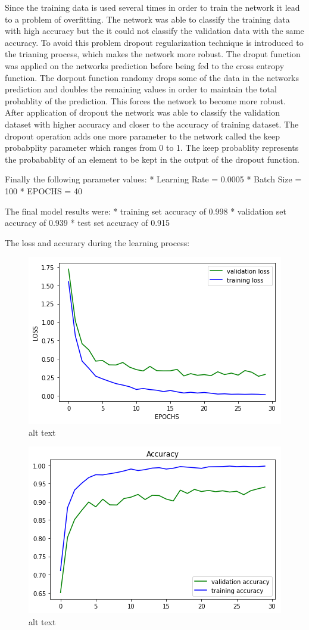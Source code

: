 \documentclass[11pt]{article}
\makeatletter
\def\maxwidth{\ifdim\Gin@nat@width>\linewidth\linewidth
    \else\Gin@nat@width\fi}
\let\Oldincludegraphics\includegraphics
\renewcommand{\includegraphics}[1]{\Oldincludegraphics[width=.8\maxwidth]{#1}}
\makeatother
\begin{document}
Since the training data is used several times in order to train the
network it lead to a problem of overfitting. The network was able to
classify the training data with high accuracy but the it could not
classify the validation data with the same accuracy. To avoid this
problem dropout regularization technique is introduced to the trianing
process, which makes the network more robust. The droput function was
applied on the networks prediction before being fed to the cross entropy
function. The dorpout function randomy drops some of the data in the
networks prediction and doubles the remaining values in order to
maintain the total probablity of the prediction. This forces the network
to become more robust. After application of dropout the network was able
to classify the validation dataset with higher accuracy and closer to
the accuracy of training dataset. The dropout operation adds one more
parameter to the network called the keep probabplity parameter which
ranges from 0 to 1. The keep probablity represents the probabablity of
an element to be kept in the output of the dropout function.

Finally the following parameter values: * Learning Rate = 0.0005 * Batch
Size = 100 * EPOCHS = 40

The final model results were: * training set accuracy of 0.998 *
validation set accuracy of 0.939 * test set accuracy of 0.915

The loss and accurary during the learning process:

\begin{figure}
\centering
\includegraphics{./Loss.png}
\caption{alt text}
\end{figure}

\begin{figure}
\centering
\includegraphics{./Accuracy.png}
\caption{alt text}
\end{figure}
\end{document}
